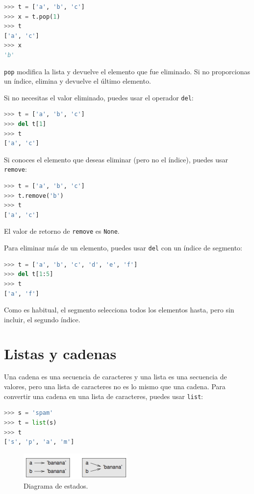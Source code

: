 \begin{lstlisting}[language=Python]
>>> t = ['a', 'b', 'c'] 
>>> x = t.pop(1) 
>>> t 
['a', 'c'] 
>>> x 
'b'
\end{lstlisting}

\texttt{pop} modifica la lista y devuelve el elemento que fue eliminado. Si no proporcionas un índice, elimina y devuelve el último elemento.

Si no necesitas el valor eliminado, puedes usar el operador \texttt{del}:

\begin{lstlisting}[language=Python]
>>> t = ['a', 'b', 'c'] 
>>> del t[1] 
>>> t 
['a', 'c']
\end{lstlisting}

Si conoces el elemento que deseas eliminar (pero no el índice), puedes usar \texttt{remove}:

\begin{lstlisting}[language=Python]
>>> t = ['a', 'b', 'c'] 
>>> t.remove('b') 
>>> t 
['a', 'c']
\end{lstlisting}

El valor de retorno de \texttt{remove} es \texttt{None}.

Para eliminar más de un elemento, puedes usar \texttt{del} con un índice de segmento:

\begin{lstlisting}[language=Python]
>>> t = ['a', 'b', 'c', 'd', 'e', 'f'] 
>>> del t[1:5] 
>>> t 
['a', 'f']
\end{lstlisting}

Como es habitual, el segmento selecciona todos los elementos hasta, pero sin incluir, el segundo índice.

\section{Listas y cadenas}

Una cadena es una secuencia de caracteres y una lista es una secuencia de valores, pero una lista de caracteres no es lo mismo que una cadena. Para convertir una cadena en una lista de caracteres, puedes usar \texttt{list}:

\begin{lstlisting}[language=Python]
>>> s = 'spam' 
>>> t = list(s) 
>>> t 
['s', 'p', 'a', 'm']
\end{lstlisting}

\begin{figure}[h]
        \centering
        \includegraphics[width=0.5\textwidth]{./images/chapter_10_2.png}
        \caption{Diagrama de estados.}
        \label{fig:10_2}
        \end{figure}


